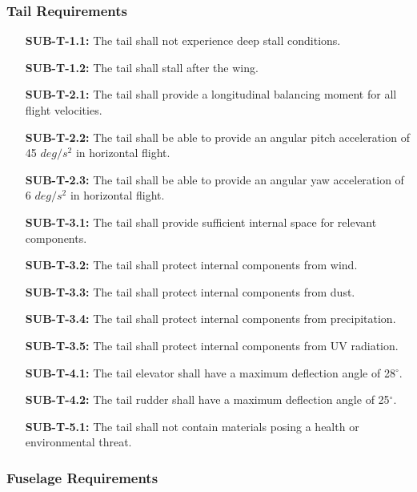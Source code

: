 \subsubsection{Tail Requirements}

\begin{enumerate}[leftmargin =3.5cm, align=parleft, labelwidth=8em]
    \item[\textbf{SUB-T-1.1:}] The tail shall not experience deep stall conditions. 
    \item[\textbf{SUB-T-1.2:}] The tail shall stall after the wing.
    \item[\textbf{SUB-T-2.1:}] The tail shall provide a longitudinal balancing moment for all flight velocities. 
    \item[\textbf{SUB-T-2.2:}] The tail shall be able to provide an angular pitch acceleration of 45 $deg/s^{2}$ in horizontal flight.
    \item[\textbf{SUB-T-2.3:}] The tail shall be able to provide an angular yaw acceleration of 6 $deg/s^{2}$ in horizontal flight.
    \item[\textbf{SUB-T-3.1:}] The tail shall provide sufficient internal space for relevant components.
    \item[\textbf{SUB-T-3.2:}] The tail shall protect internal components from wind.
    \item[\textbf{SUB-T-3.3:}] The tail shall protect internal components from dust. 
    \item[\textbf{SUB-T-3.4:}] The tail shall protect internal components from precipitation.
    \item[\textbf{SUB-T-3.5:}] The tail shall protect internal components from UV radiation.
    \item[\textbf{SUB-T-4.1:}] The tail elevator shall have a maximum deflection angle of 28$^\circ$.
    \item[\textbf{SUB-T-4.2:}] The tail rudder shall have a maximum deflection angle of 25$^\circ$.
    \item[\textbf{SUB-T-5.1:}] The tail shall not contain materials posing a health or environmental threat.
\end{enumerate}

\subsubsection{Fuselage Requirements}

